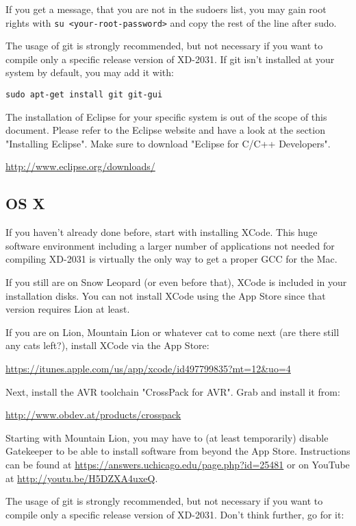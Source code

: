 If you get a message, that you are not in the 
sudoers list, you may gain root rights with \texttt{su <your-root-password>} 
and copy the rest of the line after sudo.

The usage of git is strongly recommended, but not necessary if you want to
compile only a specific release version of XD-2031. If git isn't installed
at your system by default, you may add it with:

\begin{verbatim}
sudo apt-get install git git-gui
\end{verbatim}

The installation of Eclipse for your specific system is out of the scope
of this document. Please refer to the Eclipse website and have a look
at the section "Installing Eclipse". Make sure to download "Eclipse for
C/C++ Developers". 

\url{http://www.eclipse.org/downloads/}

\subsection{OS X}
If you haven't already done before, start with installing XCode. 
This huge software environment including a larger number of applications
not needed for compiling XD-2031 is virtually the only 
way to get a proper GCC for the Mac.

If you still are on Snow Leopard (or even before that), XCode is
included in your installation disks. You can not install XCode using
the App Store since that version requires Lion at least.

If you are on Lion, Mountain Lion or whatever cat to come next (are
there still any cats left?), install XCode via the App Store:

\url{https://itunes.apple.com/us/app/xcode/id497799835?mt=12&uo=4}

Next, install the AVR toolchain "CrossPack for AVR". Grab and install it from: 

\url{http://www.obdev.at/products/crosspack}

Starting with Mountain Lion, you may have to (at least temporarily) disable
Gatekeeper to be able to install software from beyond the App Store. Instructions can be found at \url{https://answers.uchicago.edu/page.php?id=25481} or
on YouTube at \url{http://youtu.be/H5DZXA4uxeQ}.

The usage of git is strongly recommended, but not necessary if you want to
compile only a specific release version of XD-2031. Don't think further, 
go for it: 

